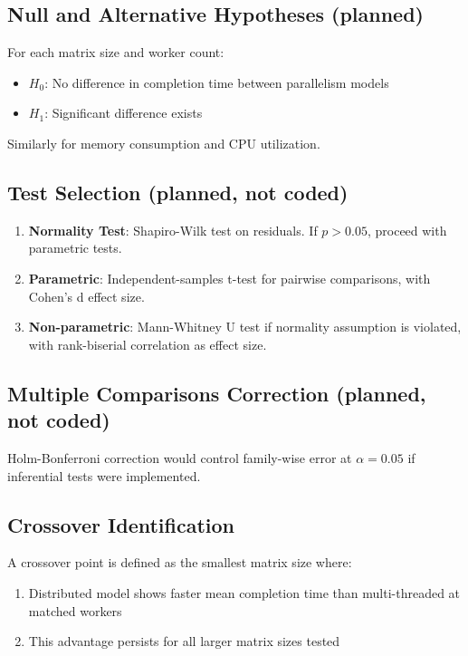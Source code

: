 \subsection{Null and Alternative Hypotheses (planned)}

For each matrix size and worker count:

\begin{itemize}
    \item $H_0$: No difference in completion time between parallelism models
    \item $H_1$: Significant difference exists
\end{itemize}

Similarly for memory consumption and CPU utilization.

\subsection{Test Selection (planned, not coded)}

\begin{enumerate}
    \item \textbf{Normality Test}: Shapiro-Wilk test on residuals. If $p > 0.05$, proceed with parametric tests.
    
    \item \textbf{Parametric}: Independent-samples t-test for pairwise comparisons, with Cohen's d effect size.
    
    \item \textbf{Non-parametric}: Mann-Whitney U test if normality assumption is violated, with rank-biserial correlation as effect size.
\end{enumerate}

\subsection{Multiple Comparisons Correction (planned, not coded)}

Holm-Bonferroni correction would control family-wise error at $\alpha=0.05$ if inferential tests were implemented.

\subsection{Crossover Identification}

A crossover point is defined as the smallest matrix size where:
\begin{enumerate}
    \item Distributed model shows faster mean completion time than multi-threaded at matched workers
    \item This advantage persists for all larger matrix sizes tested
\end{enumerate}

